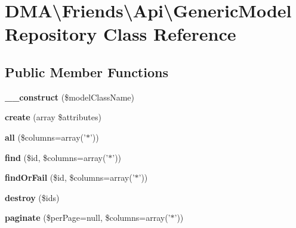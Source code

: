 \hypertarget{classDMA_1_1Friends_1_1Api_1_1GenericModelRepository}{\section{D\-M\-A\textbackslash{}Friends\textbackslash{}Api\textbackslash{}Generic\-Model\-Repository Class Reference}
\label{classDMA_1_1Friends_1_1Api_1_1GenericModelRepository}
}
\subsection*{Public Member Functions}
\begin{DoxyCompactItemize}
\item 
\hypertarget{classDMA_1_1Friends_1_1Api_1_1GenericModelRepository_a320f3591265cbdf46a9c9fa26927df10}{{\bfseries \-\_\-\-\_\-construct} (\$model\-Class\-Name)}\label{classDMA_1_1Friends_1_1Api_1_1GenericModelRepository_a320f3591265cbdf46a9c9fa26927df10}

\item 
\hypertarget{classDMA_1_1Friends_1_1Api_1_1GenericModelRepository_ac0e8251f4383610298dddda3eb7958d7}{{\bfseries create} (array \$attributes)}\label{classDMA_1_1Friends_1_1Api_1_1GenericModelRepository_ac0e8251f4383610298dddda3eb7958d7}

\item 
\hypertarget{classDMA_1_1Friends_1_1Api_1_1GenericModelRepository_a4c88d28c6fc169ae1eead0b0aa3866f9}{{\bfseries all} (\$columns=array('$\ast$'))}\label{classDMA_1_1Friends_1_1Api_1_1GenericModelRepository_a4c88d28c6fc169ae1eead0b0aa3866f9}

\item 
\hypertarget{classDMA_1_1Friends_1_1Api_1_1GenericModelRepository_ab42b1bda9479d9990e04c9d45f2a0e0d}{{\bfseries find} (\$id, \$columns=array('$\ast$'))}\label{classDMA_1_1Friends_1_1Api_1_1GenericModelRepository_ab42b1bda9479d9990e04c9d45f2a0e0d}

\item 
\hypertarget{classDMA_1_1Friends_1_1Api_1_1GenericModelRepository_a0fe974a6605164516635931f06eb4c30}{{\bfseries find\-Or\-Fail} (\$id, \$columns=array('$\ast$'))}\label{classDMA_1_1Friends_1_1Api_1_1GenericModelRepository_a0fe974a6605164516635931f06eb4c30}

\item 
\hypertarget{classDMA_1_1Friends_1_1Api_1_1GenericModelRepository_a82078490bec0c283af63fb52200224a0}{{\bfseries destroy} (\$ids)}\label{classDMA_1_1Friends_1_1Api_1_1GenericModelRepository_a82078490bec0c283af63fb52200224a0}

\item 
\hypertarget{classDMA_1_1Friends_1_1Api_1_1GenericModelRepository_a2d7794ceb5795fef531ad856b36d0daa}{{\bfseries paginate} (\$per\-Page=null, \$columns=array('$\ast$'))}\label{classDMA_1_1Friends_1_1Api_1_1GenericModelRepository_a2d7794ceb5795fef531ad856b36d0daa}

\end{DoxyCompactItemize}
